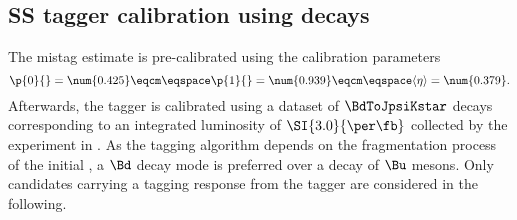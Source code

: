 \subsection[
  head={\ac*{SS} tagger calibration using \BdToJpsiKstar decays},
  tocentry={\ac*{SS} tagger calibration using \BdToJpsiKstarHyperref decays}
]{\ac*{SS} tagger calibration using \BdToJpsiKstarbfsf decays}
\label{sec:flavour_tagging:calibration:ss}

The \SSpi mistag estimate is pre-calibrated using the calibration parameters
%
\begin{equation}
\label{eq:tagging:sspion_precalibration}
    \p{0}{} = \num{0.425}\eqcm\eqspace
    \p{1}{} = \num{0.939}\eqcm\eqspace
    \langle\eta\rangle = \num{0.379}.
\end{equation}
%
Afterwards, the \SSpi tagger is calibrated using a dataset of $\BdToJpsiKstar$
decays corresponding to an integrated luminosity of $\SI{3.0}{\per\fb}$
collected by the \LHCb experiment in \RunOne. As the \SSpi tagging algorithm
depends on the fragmentation process of the initial \Bmeson, a $\Bd$ decay mode
is preferred over a decay of $\Bu$ mesons. Only candidates carrying a tagging
response from the \SSpi tagger are considered in the following.

